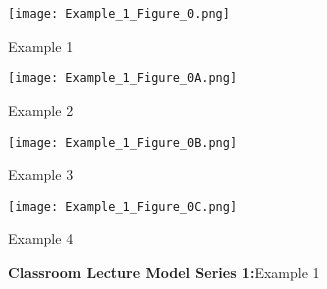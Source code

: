 \documentclass{ResumeDesignFormat1}
\begin{document}
\footnotesize
\begin{figure}[h]
	\centering
	\begin{minipage}[b]{0.5\linewidth}
		\texttt{[image: Example\_1\_Figure\_0.png]}
		\caption{\footnotesize Example 1 }
		\label{fig:FigureA}
	\end{minipage}\hfill
	\begin{minipage}[b]{0.5\linewidth}
		\texttt{[image: Example\_1\_Figure\_0A.png]}
		\caption{\footnotesize Example 2}
		\label{fig:FigureB}
	\end{minipage}\hfill
	\begin{minipage}[b]{0.5\linewidth}
		\texttt{[image: Example\_1\_Figure\_0B.png]}
		\caption{\footnotesize Example 3}
		\label{fig:FigureC}
	\end{minipage}\hfill
	\begin{minipage}[b]{0.5\linewidth}
		\texttt{[image: Example\_1\_Figure\_0C.png]}
		\caption{\footnotesize Example 4}
		\label{fig:FigureD}
	\end{minipage}\hfill
	\caption{\textcolor{c5}{\textbf{Classroom Lecture Model Series 1:}}\footnotesize Example 1 }
	\label{fig:Figure1}
\end{figure}
\end{document}
